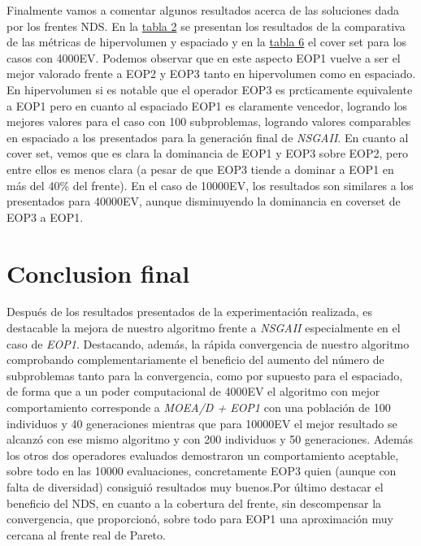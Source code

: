 Finalmente vamos a comentar algunos resultados acerca de las soluciones dada por los frentes NDS. En la \hyperref[table:2]{tabla 2} se presentan los resultados de la comparativa de las métricas de hipervolumen y espaciado y en la \hyperref[table:6]{tabla 6} el cover set para los casos con 4000EV. Podemos observar que en este aspecto EOP1 vuelve a ser el mejor valorado frente a EOP2 y EOP3 tanto en hipervolumen como en espaciado. En hipervolumen si es notable que el operador EOP3 es prcticamente equivalente a EOP1 pero en cuanto al espaciado EOP1 es claramente vencedor, logrando los mejores valores para el caso con 100 subproblemas, logrando valores comparables en espaciado a los presentados para la generación final de \textit{NSGAII}. En cuanto al cover set,  vemos que es clara la dominancia de EOP1 y EOP3 sobre EOP2, pero entre ellos es menos clara (a pesar de que EOP3 tiende a dominar a EOP1 en más del 40\% del frente). En el caso de 10000EV, los resultados son similares a los presentados para 40000EV, aunque disminuyendo la dominancia en coverset de EOP3 a EOP1.\\ 

\section{Conclusion final}

Después de los resultados presentados de la experimentación realizada, es destacable la mejora de nuestro algoritmo frente a \textit{NSGAII} especialmente en el caso de \textit{EOP1}. Destacando, además, la rápida convergencia de nuestro algoritmo comprobando complementariamente el beneficio del aumento del número de subproblemas tanto para la convergencia, como por supuesto para el espaciado, de forma que a un poder computacional de 4000EV el algoritmo con mejor comportamiento corresponde a \textit{MOEA/D + EOP1} con una población de 100 individuos y 40 generaciones mientras que para 10000EV el mejor resultado se alcanzó con ese mismo algoritmo y con 200 individuos y 50 generaciones. Además los otros dos operadores evaluados demostraron un comportamiento aceptable, sobre todo en las 10000 evaluaciones, concretamente EOP3 quien (aunque con falta de diversidad) consiguió resultados muy buenos.Por último destacar el beneficio del NDS, en cuanto a la cobertura del frente, sin descompensar la convergencia, que proporcionó, sobre todo para EOP1 una aproximación muy cercana al frente real de Pareto.\\


